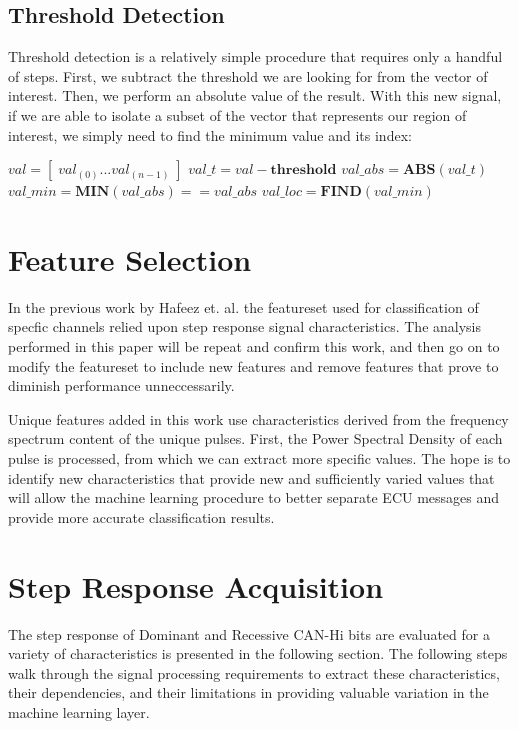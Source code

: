 \documentclass[conference]{IEEEtran}
\begin{document}
\subsection{Threshold Detection} \label{sec:Threshold}
Threshold detection is a relatively simple procedure that requires only a handful of steps. First, we subtract the threshold we are looking for from the vector of interest. Then, we perform an absolute value of the result. With this new signal, if we are able to isolate a subset of the vector that represents our region of  interest, we simply need to find the minimum value and its index:
\medbreak
\begin{algorithmic}
\STATE $val = [\;val_{(0)} ... val_{(n-1)}\;]$
\STATE $val\_t = val - \textbf{threshold}$
\STATE $val\_abs = \textbf{ABS}(val\_t)$
\STATE $val\_min = \textbf{MIN}(val\_abs) == val\_abs$
\STATE $val\_loc = \textbf{FIND}( val\_min ) $
\end{algorithmic}



\section{Feature Selection}

In the previous work by Hafeez et. al. \cite{hafeez2019} the featureset used for classification of specfic channels relied upon step response signal characteristics. The analysis performed in this paper will be repeat and confirm this work, and then go on to modify the featureset to include new features and remove features that prove to diminish performance unneccessarily.

Unique features added in this work use characteristics derived from the frequency spectrum content of the unique pulses. First, the Power Spectral Density of each pulse is processed, from which we can extract more specific values. The hope is to identify new characteristics that provide new and sufficiently varied values that will allow the machine learning procedure to better separate ECU messages and provide more accurate classification results.



\section{Step Response Acquisition}

The step response of Dominant and Recessive CAN-Hi bits are evaluated for a variety of characteristics is presented in the following section. The following steps walk through the signal processing requirements to extract these characteristics, their dependencies, and their limitations in providing valuable variation in the machine learning layer.
\end{document}
